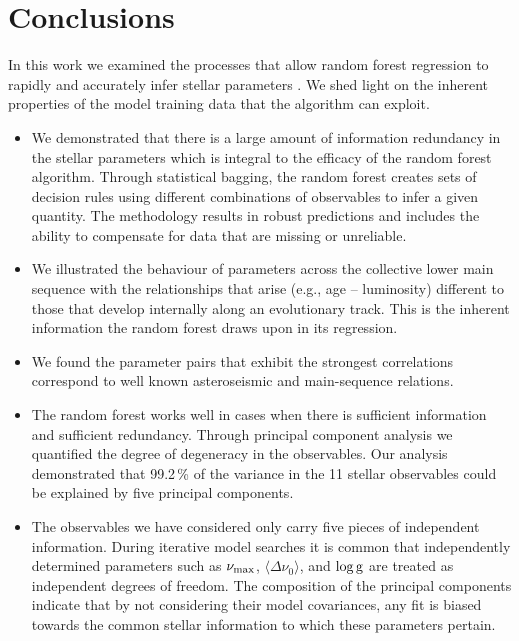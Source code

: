 \section{Conclusions}
In this work we examined the processes that allow random forest regression to rapidly and accurately infer stellar parameters \citep{2016apj...830...31b}. We shed light on the inherent properties of the model training data that the algorithm can exploit. 

\begin{itemize}
   
             \item We demonstrated that there is a large amount of information redundancy in the stellar parameters which is integral to the efficacy of the random forest algorithm. Through statistical bagging, the random forest  creates sets of decision rules using different combinations of observables to infer a given quantity. The methodology results in  robust predictions and includes the ability to compensate for data that are missing or unreliable. 
             
          \item We illustrated the behaviour of parameters across the collective lower main sequence with the relationships that arise (e.g., age -- luminosity) different to those that develop internally along an evolutionary track. This is the inherent information the random forest draws upon in its regression.
     
         \item  We found the parameter pairs that exhibit the strongest correlations correspond to well known asteroseismic and main-sequence relations.        
         
 


   \item The random forest works well in cases when there is sufficient information and sufficient redundancy.
   Through principal component analysis we quantified the degree of degeneracy in the observables. 
   Our analysis demonstrated that 99.2\,\% of the variance in the 11 stellar observables could be explained by five principal components.
       
             
 \item The observables we have considered only carry five pieces of independent information.
             During  iterative model searches it is common that independently determined parameters such as $\nu_{\rm{max}}$, $\langle\Delta\nu_0\rangle$, and $\log \rm{g}$ are treated as independent degrees of freedom. The composition of the principal components indicate that by not considering their model covariances, any fit is biased towards the common stellar information to which these parameters pertain.
   


\end{itemize}
